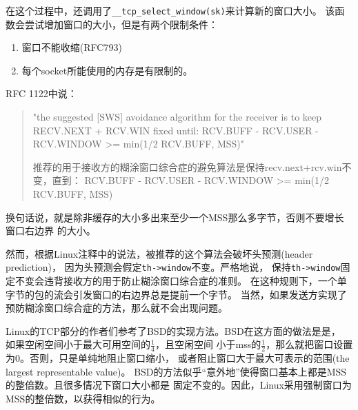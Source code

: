 在这个过程中，还调用了\texttt{__tcp_select_window(sk)}来计算新的窗口大小。
该函数会尝试增加窗口的大小，但是有两个限制条件：

\begin{enumerate}
  \item 窗口不能收缩(RFC793)
  \item 每个socket所能使用的内存是有限制的。
\end{enumerate}

RFC 1122中说：
\begin{quote}
"the suggested [SWS] avoidance algorithm for the receiver is to keep
RECV.NEXT + RCV.WIN fixed until:
RCV.BUFF - RCV.USER - RCV.WINDOW >= min(1/2 RCV.BUFF, MSS)"

推荐的用于接收方的糊涂窗口综合症的避免算法是保持recv.next+rcv.win不变，直到：
RCV.BUFF - RCV.USER - RCV.WINDOW >= min(1/2 RCV.BUFF, MSS)
\end{quote}

换句话说，就是除非缓存的大小多出来至少一个MSS那么多字节，否则不要增长窗口右边界
的大小。

然而，根据Linux注释中的说法，被推荐的这个算法会破坏头预测(header prediction)，
因为头预测会假定\texttt{th->window}不变。严格地说，
保持\texttt{th->window}固定不变会违背接收方的用于防止糊涂窗口综合症的准则。
在这种规则下，一个单字节的包的流会引发窗口的右边界总是提前一个字节。
当然，如果发送方实现了预防糊涂窗口综合症的方法，那么就不会出现问题。

Linux的TCP部分的作者们参考了BSD的实现方法。BSD在这方面的做法是是，
如果空闲空间小于最大可用空间的$\frac{1}{4}$，且空闲空间
小于mss的$\frac{1}{2}$，那么就把窗口设置为0。否则，只是单纯地阻止窗口缩小，
或者阻止窗口大于最大可表示的范围(the largest representable value)。
BSD的方法似乎“意外地”使得窗口基本上都是MSS的整倍数。且很多情况下窗口大小都是
固定不变的。因此，Linux采用强制窗口为MSS的整倍数，以获得相似的行为。

